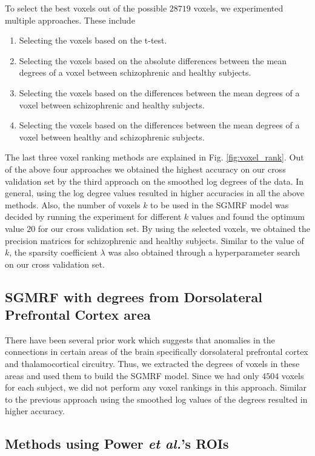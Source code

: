 \documentclass{article} %
\begin{document}
To select the best voxels out of the possible $28719$ voxels, we experimented multiple approaches. 
These include \begin{enumerate}
  \item Selecting the voxels based on the t-test.
  \item Selecting the voxels based on the absolute differences between the mean degrees of a voxel between schizophrenic and healthy subjects.
  \item Selecting the voxels based on the differences between the mean degrees of a voxel between schizophrenic and healthy subjects.
  \item Selecting the voxels based on the differences between the mean degrees of a voxel between healthy and schizophrenic subjects.
\end{enumerate}
The last three voxel ranking methods are explained in Fig. \ref{fig:voxel_rank}. 
Out of the above four approaches we obtained the highest accuracy on our cross 
validation set by the third approach on the smoothed log degrees of the data. In general, using the log degree values resulted in higher accuracies in all the above methods. Also, the number of voxels $k$ to be used 
in the SGMRF model was decided by running the experiment for different $k$ 
values and found the optimum value $20$ for our cross validation set. By using 
the selected voxels, we obtained the precision matrices for schizophrenic and 
healthy subjects. Similar to the value of $k$, the sparsity coefficient 
$\lambda$ was also obtained through a hyperparameter search on our cross 
validation set.

\subsection{SGMRF with degrees from Dorsolateral Prefrontal Cortex area}
There have been several prior work which suggests that anomalies in the connections in certain areas of the brain specifically dorsolateral prefrontal cortex\cite{Potkin2008} and thalamocortical\cite{Cheng2015} circuitry. Thus, we extracted the degrees of voxels in these areas and used them to build the SGMRF model. Since we had only $4504$ voxels for each subject, we did not perform any voxel rankings in this approach. Similar to the previous approach using the smoothed log values of the degrees resulted in higher accuracy.

\subsection{Methods using Power \emph{et al.}'s ROIs}
\end{document}
